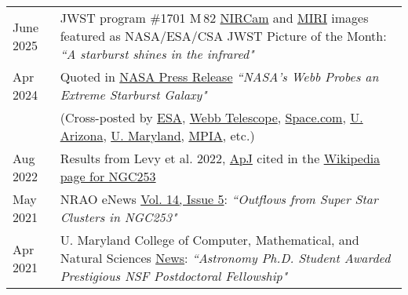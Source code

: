 \documentclass[11pt]{article}
\begin{document}
\begin{longtable}{p{} p{}}


June 2025 & JWST program \#1701 M\,82 \href{https://esawebb.org/images/potm2506a/}{NIRCam} and \href{https://esawebb.org/images/potm2506b/}{MIRI} images featured as NASA/ESA/CSA JWST Picture of the Month: \textit{``A starburst shines in the infrared"}\smallskip\\  

Apr 2024 & Quoted in \href{https://science.nasa.gov/missions/webb/nasas-webb-probes-an-extreme-starburst-galaxy/}{NASA Press Release} \textit{``NASA's Webb Probes an Extreme Starburst Galaxy"}\\
& {\small (Cross-posted by \href{https://esawebb.org/news/weic2410/}{ESA}, \href{https://webbtelescope.org/contents/news-releases/2024/news-2024-109}{Webb Telescope}, \href{https://www.space.com/james-webb-space-telescope-starburst-galaxy-image}{Space.com}, \href{https://astro.arizona.edu/news/steward-observatorys-rebecca-levy-second-author-jwst-study-probes-extreme-starburst-galaxy}{U. Arizona}, \href{https://cmns.umd.edu/news-events/news/nasas-james-webb-space-telescope-captures-images-galaxy-m82s-glowing-core-and}{U. Maryland}, \href{https://www.mpia.de/news/science/2024-06-jwst-m82}{MPIA}, etc.)}\smallskip\\

Aug 2022 & Results from Levy et al. 2022, \href{https://ui.adsabs.harvard.edu/abs/2022ApJ...935...19L/abstract}{ApJ} cited in the \href{https://en.wikipedia.org/wiki/Sculptor_Galaxy#cite_ref-15}{Wikipedia page for NGC253}\smallskip\\

May 2021 & NRAO eNews \href{https://science.nrao.edu/enews/14.5/index.shtml#outflows}{Vol. 14, Issue 5}: \textit{``Outflows from Super Star Clusters in NGC253"} \smallskip\\

Apr 2021 & U. Maryland College of Computer, Mathematical, and Natural Sciences \href{https://cmns.umd.edu/news-events/features/4765}{News}: \textit{``Astronomy Ph.D. Student Awarded Prestigious NSF Postdoctoral Fellowship"}\\ 

\end{longtable}
\end{document}
